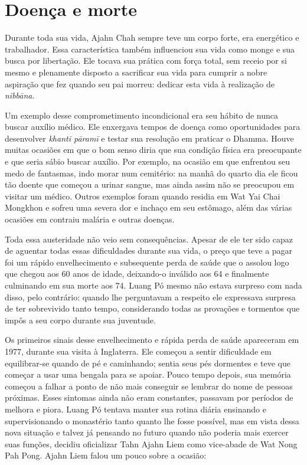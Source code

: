 \chapter{Doença e morte}

Durante toda sua vida, Ajahn Chah sempre teve um corpo forte, era
energético e trabalhador. Essa característica também influenciou sua
vida como monge e sua busca por libertação. Ele tocava sua prática com
força total, sem receio por si mesmo e plenamente disposto a sacrificar
sua vida para cumprir a nobre aspiração que fez quando seu pai morreu:
dedicar esta vida à realização de \emph{nibbāna}.

Um exemplo desse comprometimento incondicional era seu hábito de nunca
buscar auxílio médico. Ele enxergava tempos de doença como oportunidades
para desenvolver \emph{khanti pāramī} e testar sua resolução em praticar
o Dhamma. Houve muitas ocasiões em que o bom senso diria que sua
condição física era preocupante e que seria sábio buscar auxílio. Por
exemplo, na ocasião em que enfrentou seu medo de fantasmas, indo morar
num cemitério: na manhã do quarto dia ele ficou tão doente que começou a
urinar sangue, mas ainda assim não se preocupou em visitar um médico.
Outros exemplos foram quando residia em Wat Yai Chai Mongkhon e sofreu
uma severa dor e inchaço em seu estômago, além das várias ocasiões em
contraiu malária e outras doenças.

Toda essa austeridade não veio sem consequências. Apesar de ele ter sido
capaz de aguentar todas essas dificuldades durante sua vida, o preço que
teve a pagar foi um rápido envelhecimento e subsequente perda de saúde
que o assolou logo que chegou aos 60 anos de idade, deixando-o inválido
aos 64 e finalmente culminando em sua morte aos 74. Luang Pó mesmo não
estava surpreso com nada disso, pelo contrário: quando lhe perguntavam a
respeito ele expressava surpresa de ter sobrevivido tanto tempo,
considerando todas as provações e tormentos que impôs a seu corpo
durante sua juventude.

Os primeiros sinais desse envelhecimento e rápida perda de saúde
apareceram em 1977, durante sua visita à Inglaterra. Ele começou a
sentir dificuldade em equilibrar-se quando de pé e caminhando; sentia
seus pés dormentes e teve que começar a usar uma bengala para se apoiar.
Pouco tempo depois, sua memória começou a falhar a ponto de não mais
conseguir se lembrar do nome de pessoas próximas. Esses sintomas ainda
não eram constantes, passavam por períodos de melhora e piora. Luang Pó
tentava manter sua rotina diária ensinando e supervisionando o
monastério tanto quanto lhe fosse
possível\protect\hypertarget{ux5fux5fDdeLinkux5fux5f4952ux5f231057122}{}{},
mas em vista dessa nova situação e talvez já pensando no futuro quando
não poderia mais exercer suas funções, decidiu oficializar Tahn Ajahn
Liem como vice-abade de Wat Nong Pah Pong. Ajahn Liem falou um pouco
sobre a ocasião:

